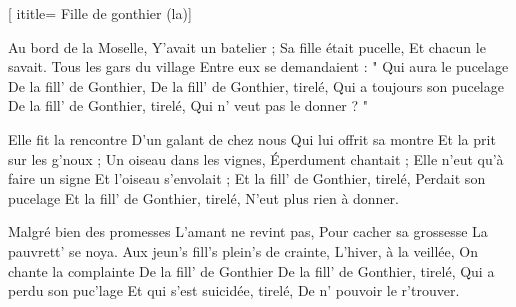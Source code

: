  [
ititle= {Fille de gonthier (la)}]

\beginverse
Au bord de la Moselle,
Y'avait un batelier ;
Sa fille était pucelle,
Et chacun le savait.
Tous les gars du village
Entre eux se demandaient :
" Qui aura le pucelage
De la fill' de Gonthier,
De la fill' de Gonthier, tirelé,
Qui a toujours son pucelage
De la fill' de Gonthier, tirelé,
Qui n' veut pas le donner ? "
\endverse

\beginverse
Elle fit la rencontre
D'un galant de chez nous
Qui lui offrit sa montre
Et la prit sur les g'noux ;
Un oiseau dans les vignes,
Éperdument chantait ;
Elle n'eut qu'à faire un signe
Et l'oiseau s'envolait ;
Et la fill' de Gonthier, tirelé,
Perdait son pucelage
Et la fill' de Gonthier, tirelé,
N'eut plus rien à donner.
\endverse

\beginverse
Malgré bien des promesses
L'amant ne revint pas,
Pour cacher sa grossesse
La pauvrett' se noya.
Aux jeun's fill's plein's de crainte,
L'hiver, à la veillée,
On chante la complainte
De la fill' de Gonthier
De la fill' de Gonthier, tirelé,
Qui a perdu son puc'lage
Et qui s'est suicidée, tirelé,
De n' pouvoir le r'trouver.
\endverse

\endsong